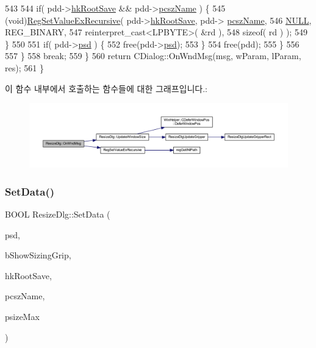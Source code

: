 \begin{DoxyCode}
543         
544         \textcolor{keywordflow}{if}( pdd->\mbox{\hyperlink{struct_dialog_data_a25f688fc8282ac98c0d49658310425ce}{hkRootSave}} && pdd->\mbox{\hyperlink{struct_dialog_data_a6ab5be3a7126b6f9b5fcb7131fcf2909}{pcszName}} ) \{
545           (void)\mbox{\hyperlink{_resize_dlg_8cpp_a6e2db8b85e2460acfe66d5d3183d3cd7}{RegSetValueExRecursive}}( pdd->\mbox{\hyperlink{struct_dialog_data_a25f688fc8282ac98c0d49658310425ce}{hkRootSave}}, pdd->
      \mbox{\hyperlink{struct_dialog_data_a6ab5be3a7126b6f9b5fcb7131fcf2909}{pcszName}},
546                                         \mbox{\hyperlink{getopt1_8c_a070d2ce7b6bb7e5c05602aa8c308d0c4}{NULL}}, REG\_BINARY,
547                                         reinterpret\_cast<LPBYTE>( &rd ),
548                                         \textcolor{keyword}{sizeof}( rd ) );
549         \}
550         
551         \textcolor{keywordflow}{if}( pdd->\mbox{\hyperlink{struct_dialog_data_aefb399f16dab34e6a2da67716d6147fc}{psd}} ) \{
552           free(pdd->\mbox{\hyperlink{struct_dialog_data_aefb399f16dab34e6a2da67716d6147fc}{psd}});
553         \}
554         free(pdd);
555       \}
556       
557     \}
558     \textcolor{keywordflow}{break};
559   \}
560   \textcolor{keywordflow}{return} CDialog::OnWndMsg(msg, wParam, lParam, res);
561 \}
\end{DoxyCode}
이 함수 내부에서 호출하는 함수들에 대한 그래프입니다.\+:
\nopagebreak
\begin{figure}[H]
\begin{center}
\leavevmode
\includegraphics[width=350pt]{class_resize_dlg_a9d3f421da2488db11224b0508be654fd_cgraph}
\end{center}
\end{figure}
\mbox{\label{class_resize_dlg_a6a3965f44a0c2f5ba9aaa798a9a81df5}} 
\subsubsection{\texorpdfstring{Set\+Data()}{SetData()}}
{\footnotesize\ttfamily B\+O\+OL Resize\+Dlg\+::\+Set\+Data (\begin{DoxyParamCaption}\item[{\mbox{\hyperlink{getopt1_8c_a2c212835823e3c54a8ab6d95c652660e}{const}} \mbox{\hyperlink{struct_dialog_sizer_sizing_item}{Dialog\+Sizer\+Sizing\+Item}} $\ast$}]{psd,  }\item[{B\+O\+OL}]{b\+Show\+Sizing\+Grip,  }\item[{H\+K\+EY}]{hk\+Root\+Save,  }\item[{L\+P\+C\+T\+S\+TR}]{pcsz\+Name,  }\item[{S\+I\+ZE $\ast$}]{psize\+Max }\end{DoxyParamCaption})}



